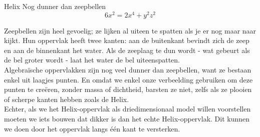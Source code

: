 \begin{surferPage}{Helix}
Nog dunner dan zeepbellen\\
  \smallskip
\[6x^2	= 2x^4	+ y^2	z^2\]

\singlespacing
Zeepbellen zijn heel gevoelig; ze lijken al uiteen te spatten als je er nog maar naar kijkt. Hun oppervlak heeft twee kanten: aan de buitenkant bevindt zich de zeep en aan de binnenkant het water. Als de zeeplaag te dun wordt - wat gebeurt als de bel groter wordt - laat het water de bel uiteenspatten.\\
\vspace{0,3cm}
Algebra\"ische oppervlakken zijn nog veel dunner dan zeepbellen, want ze bestaan enkel uit laagjes punten. En omdat we enkel onze verbeelding gebruiken om deze punten te cre\"eren, zonder massa of dichtheid, barsten ze niet, zelfs als ze plooien of scherpe kanten hebben zoals de Helix.\\
\vspace{0,3cm}
Echter, als we het Helix-oppervlak als driedimensionaal model willen voorstellen moeten we iets bouwen dat dikker is dan het echte Helix-oppervlak. Dit kunnen we doen door het oppervlak langs \'e\'en kant te versterken.
\end{surferPage}
